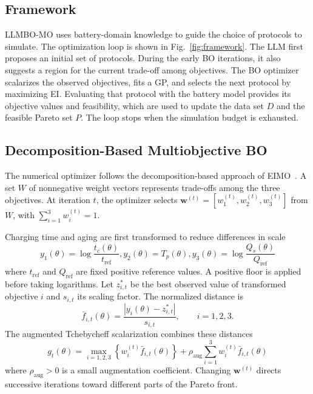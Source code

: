 \documentclass[lettersize,journal]{IEEEtran}
\begin{document}
\subsection{Framework}
\label{sec:framework}

LLMBO-MO uses battery-domain knowledge to guide the choice of protocols to
simulate. The optimization loop is shown in Fig.~\ref{fig:framework}. The LLM
first proposes an initial set of protocols. During the early BO iterations,
it also suggests a region for the current trade-off among objectives. The BO
optimizer scalarizes the observed objectives, fits a GP, and selects the next
protocol by maximizing EI. Evaluating that protocol with the battery model
provides its objective values and feasibility, which are used to update the
data set $D$ and the feasible Pareto set $P$. The loop stops when the
simulation budget is exhausted.

\subsection{Decomposition-Based Multiobjective BO}
\label{sec:parego_backbone}

The numerical optimizer follows the decomposition-based approach of
EIMO~\cite{refEIMO}. A set $W$ of nonnegative weight vectors represents
trade-offs among the three objectives. At iteration $t$, the optimizer selects
$\mathbf w^{(t)}=[w_1^{(t)},w_2^{(t)},w_3^{(t)}]$ from $W$, with
$\sum_{i=1}^{3}w_i^{(t)}=1$.

Charging time and aging are first transformed to reduce differences in scale
\begin{equation}
 y_1(\theta)=\log\!\frac{t_c(\theta)}{t_{\mathrm{ref}}},
 y_2(\theta)=T_p(\theta),
 y_3(\theta)=\log\!\frac{Q_s(\theta)}{Q_{\mathrm{ref}}}
 \label{eq:objective_transform}
\end{equation}
where $t_{\mathrm{ref}}$ and $Q_{\mathrm{ref}}$ are fixed positive reference
values. A positive floor is applied before taking logarithms. Let
$z_{i,t}^{*}$ be the best observed value of transformed objective $i$ and
$s_{i,t}$ its scaling factor. The normalized distance is
\begin{equation}
 \bar f_{i,t}(\theta)=
 \frac{|y_i(\theta)-z_{i,t}^{*}|}{s_{i,t}},\qquad i=1,2,3.
 \label{eq:objective_scaling}
\end{equation}
The augmented Tchebycheff scalarization combines these distances
\begin{equation}
 g_t(\theta)=
 \max_{i=1,2,3}\!\left\{w_i^{(t)}\bar f_{i,t}(\theta)\right\}
 +\rho_{\mathrm{aug}}\sum_{i=1}^{3}w_i^{(t)}\bar f_{i,t}(\theta)
 \label{eq:tchebycheff}
\end{equation}
where $\rho_{\mathrm{aug}}>0$ is a small augmentation coefficient. Changing
$\mathbf w^{(t)}$ directs successive iterations toward different parts of the
Pareto front.
\end{document}
